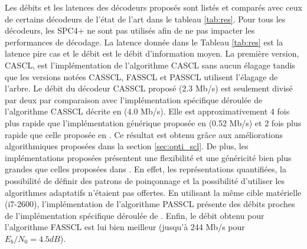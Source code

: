 Les débits et les latences des décodeurs proposés sont listés et comparés avec ceux de certains décodeurs de l'état de l'art dans le tableau \ref{tab:res}. Pour tous les décodeurs, les \noeuds SPC4+ ne sont pas utilisés afin de ne pas impacter les performances de décodage. La latence donnée dans le Tableau \ref{tab:res} est la latence \og pire cas \fg et le débit est le débit d'information moyen. La première version, CASCL, est l'implémentation de l'algorithme CASCL sans aucun élagage tandis que les versions notées CASSCL, FASSCL et PASSCL utilisent l'élagage de l'arbre. Le débit du décodeur CASSCL proposé (2.3 Mb/s) est seulement divisé par deux par comparaison avec l'implémentation spécifique déroulée de l'algorithme CASSCL décrite en \cite{sarkis_fast_2016} (4.0 Mb/s). Elle est approximativement 4 fois plus rapide que l'implémentation générique proposée en \cite{sarkis_increasing_2014} (0.52 Mb/s) et 2 fois plus rapide que celle proposée en \cite{shen_low-latency_2016}. Ce résultat est obtenu grâce aux améliorations algorithmiques proposées dans la section \ref{sec:opti_scl}. De plus, les implémentations proposées présentent une flexibilité et une généricité bien plus grandes que celles proposées dans \cite{sarkis_increasing_2014,shen_low-latency_2016}. En effet, les représentations quantifiées, la possibilité de définir des patrons de poinçonnage et la possibilité d'utiliser les algorithmes adaptatifs n'étaient pas offertes. En utilisant la même cible matérielle (i7-2600), l'implémentation de l'algorithme PASSCL présente des débits proches de l'implémentation spécifique déroulée de \cite{sarkis_fast_2016}. Enfin, le débit obtenu pour l'algorithme FASSCL est lui bien meilleur (jusqu'à 244 Mb/s pour $E_b/N_0=4.5dB$).

